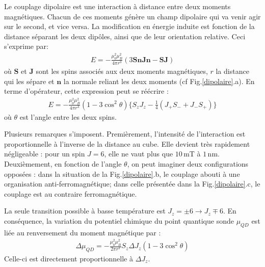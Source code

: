 Le couplage dipolaire est une interaction à distance entre deux moments magnétiques. Chacun de ces moments génère un champ dipolaire qui va venir agir sur le second, et vice versa. La modification en énergie induite est fonction de la distance séparant les deux dipôles, ainsi que de leur orientation relative. Ceci s'exprime par:
\begin{eqnarray}
E = -\frac{\mu_0^2 \mu_B^2}{4\pi r^3}(3\mathbf{SnJn} - \mathbf{SJ}) \nonumber
\end{eqnarray}
où $\mathbf{S}$ et $\mathbf{J}$ sont les spins associés aux deux moments magnétiques, $r$ la distance qui les sépare et $\mathbf{n}$ la normale reliant les deux moments (cf Fig.\ref{dipolaire}.a). En terme d'opérateur, cette expression peut se réécrire :
\begin{eqnarray}
E = -\frac{\mu_0^2 \mu_B^2}{4\pi r^3}(1 - 3 \cos^2 \theta) \lbrace S_zJ_z - \frac{1}{4}(J_+S_- + J_-S_+)\rbrace \nonumber
\end{eqnarray}
où $\theta$ est l'angle entre les deux spins.

Plusieurs remarques s'imposent. Premièrement, l'intensité de l'interaction est proportionnelle à l'inverse de la distance au cube. Elle devient très rapidement négligeable : pour un spin $J=6$, elle ne vaut plus que $10$\,mT à $1$\,nm. Deuxièmement, en fonction de l'angle $\theta$, on peut imaginer deux configurations opposées : dans la situation de la Fig.\ref{dipolaire}.b, le couplage abouti à une organisation anti-ferromagnétique; dans celle présentée dans la Fig.\ref{dipolaire}.c, le couplage est au contraire ferromagnétique.

La seule transition possible à basse température est $J_z=\pm6 \rightarrow J_z \mp 6$. En conséquence, la variation du potentiel chimique du point quantique sonde $\mu_{QD}$ est liée au renversement du moment magnétique par :
\begin{eqnarray}
\Delta \mu_{QD} = -\frac{\mu_0^2 \mu_B^2}{2\pi r^3}S_z\Delta J_z(1 - 3 \cos^2 \theta)   \nonumber
\end{eqnarray}
Celle-ci est directement proportionnelle à $\Delta J_z$.


